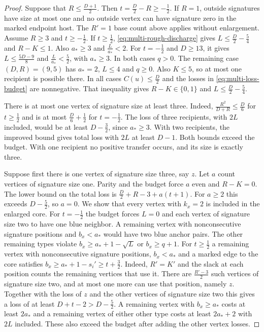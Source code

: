 \begin{proof}
Suppose that $R\le\frac{D+1}{2}$. Then $t=\frac{D}{2}-R\ge-\frac{1}{2}$.
If $R=1$, outside signatures have size at most
one and no outside vertex can have signature zero in the marked
endpoint host. The $R'=1$ base count above applies without enlargement.
Assume $R\ge3$ and $t\ge-\frac{1}{2}$. If $t\ge\frac{1}{2}$,
\eqref{eq:multi-rough-discharge} gives $L\le \frac{D}{2}-\frac{5}{4}$ and $R-K\le1$.
Also $a_*\ge3$ and $\frac{L}{a_*}<2$. For $t=-\frac{1}{2}$ and $D\ge13$, it gives
$L\le\frac{5D-9}{8}$ and $\frac{L}{a_*}<\frac{5}{2}$, with $a_*\ge3$. In both cases
$q>0$. The remaining case $(D,R)=(9,5)$ has $a_*=2$, $L\le4$ and
$q\ge0$. Also $K\le5$, so at most one recipient is possible there.
In all cases $C(u)\le \frac{D}{2}$ and the losses in
\eqref{eq:multi-loss-budget} are nonnegative. That inequality gives
$R-K\in\{0,1\}$ and $L\le \frac{D}{2}-\frac{5}{4}$.

There is at most one vertex of signature size at least three.
Indeed, $\frac{R^2}{D+R}\le \frac{D}{6}$ for $t\ge\frac{1}{2}$ and is at most $\frac{D}{6}+\frac{1}{2}$
for $t=-\frac{1}{2}$. The loss of three recipients, with $2L$ included,
would be at least $D-\frac{3}{2}$, since $a_*\ge3$. With two recipients,
the improved bound gives total loss with $2L$ at least $D-1$.
Both bounds exceed the budget. With one recipient no positive
transfer occurs, and its size is exactly three.

Suppose first there is one vertex of signature size three, say $z$. Let $a$
count vertices of signature size one. Parity and the budget force $a$ even
and $R-K=0$. The lower bound on the total loss is
$\frac{D}{2}+R-3+a(t+1)$. For $a\ge2$ this exceeds $D-\frac{5}{2}$, so $a=0$.
We show that every vertex with $k_x=2$ is included in the enlarged core.
For $t=-\frac{1}{2}$ the budget forces $L=0$ and each vertex of signature size two
to have one blue neighbor. A remaining vertex with nonconsecutive
signature positions and $b_x<a_*$ would have two blue anchor pairs.
The other remaining types
violate $b_x\ge a_*+1-\sqrt L$ or $b_x\ge q+1$. For $t\ge\frac{1}{2}$ a
remaining vertex with nonconsecutive signature positions, $b_x<a_*$
and a marked edge to the core satisfies
$b_x\ge a_*+1-s_i'\ge t+\frac{3}{2}$. Indeed, $R'=K'$ and the slack
at each position counts the remaining vertices that use it.
There are $\frac{R'-3}{2}$ such vertices of signature size two,
and at most one more can use that position, namely $z$.
Together with the loss of $z$ and the other vertices of signature size two
this gives a loss of at least $D+t-2>D-\frac{5}{2}$. A remaining vertex with $b_x\ge a_*$
costs at least $2a_*$ and a remaining vertex of either other type
costs at least $2a_*+2$ with $2L$ included. These also exceed the
budget after adding the other vertex losses.


\end{proof}
